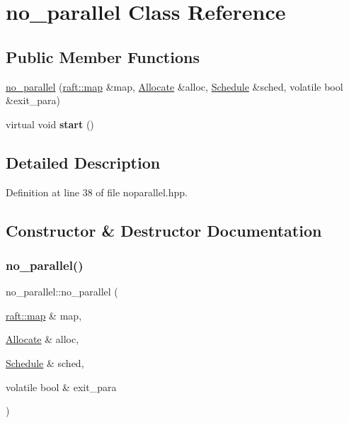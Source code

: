 \hypertarget{classno__parallel}{}\section{no\+\_\+parallel Class Reference}
\label{classno__parallel}
\subsection*{Public Member Functions}
\begin{DoxyCompactItemize}
\item 
\hyperlink{classno__parallel_a3cfd2768ad5afc822b7133641d8d3330}{no\+\_\+parallel} (\hyperlink{classraft_1_1map}{raft\+::map} \&map, \hyperlink{class_allocate}{Allocate} \&alloc, \hyperlink{class_schedule}{Schedule} \&sched, volatile bool \&exit\+\_\+para)
\item 
\hypertarget{classno__parallel_a12f3385bef70b53a2f406a2158580571}{}\label{classno__parallel_a12f3385bef70b53a2f406a2158580571} 
virtual void {\bfseries start} ()
\end{DoxyCompactItemize}


\subsection{Detailed Description}


Definition at line 38 of file noparallel.\+hpp.



\subsection{Constructor \& Destructor Documentation}
\hypertarget{classno__parallel_a3cfd2768ad5afc822b7133641d8d3330}{}\label{classno__parallel_a3cfd2768ad5afc822b7133641d8d3330} 
\subsubsection{\texorpdfstring{no\+\_\+parallel()}{no\_parallel()}}
{\footnotesize\ttfamily no\+\_\+parallel\+::no\+\_\+parallel (\begin{DoxyParamCaption}\item[{\hyperlink{classraft_1_1map}{raft\+::map} \&}]{map,  }\item[{\hyperlink{class_allocate}{Allocate} \&}]{alloc,  }\item[{\hyperlink{class_schedule}{Schedule} \&}]{sched,  }\item[{volatile bool \&}]{exit\+\_\+para }\end{DoxyParamCaption})}

